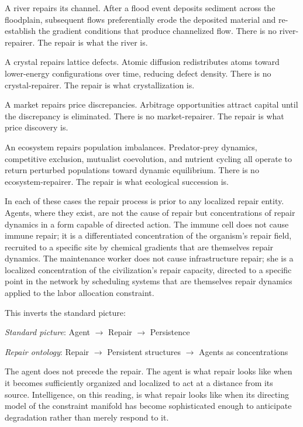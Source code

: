 \documentclass[11pt, a4paper]{article}
\theoremstyle{definition}
\theoremstyle{remark}
\begin{document}
A river repairs its channel. After a flood event deposits sediment across the
floodplain, subsequent flows preferentially erode the deposited material and
re-establish the gradient conditions that produce channelized flow. There is no
river-repairer. The repair is what the river is.

A crystal repairs lattice defects. Atomic diffusion redistributes atoms toward
lower-energy configurations over time, reducing defect density. There is no
crystal-repairer. The repair is what crystallization is.

A market repairs price discrepancies. Arbitrage opportunities attract capital
until the discrepancy is eliminated. There is no market-repairer. The repair
is what price discovery is.

An ecosystem repairs population imbalances. Predator-prey dynamics, competitive
exclusion, mutualist coevolution, and nutrient cycling all operate to return
perturbed populations toward dynamic equilibrium. There is no
ecosystem-repairer. The repair is what ecological succession is.

In each of these cases the repair process is prior to any localized repair
entity. Agents, where they exist, are not the cause of repair but concentrations
of repair dynamics in a form capable of directed action. The immune cell does not
cause immune repair; it is a differentiated concentration of the organism's
repair field, recruited to a specific site by chemical gradients that are
themselves repair dynamics. The maintenance worker does not cause infrastructure
repair; she is a localized concentration of the civilization's repair capacity,
directed to a specific point in the network by scheduling systems that are
themselves repair dynamics applied to the labor allocation constraint.

This inverts the standard picture:

\medskip
\noindent\textit{Standard picture}: Agent $\to$ Repair $\to$ Persistence

\noindent\textit{Repair ontology}: Repair $\to$ Persistent structures $\to$ Agents as concentrations
\medskip

The agent does not precede the repair. The agent is what repair looks like when
it becomes sufficiently organized and localized to act at a distance from its
source. Intelligence, on this reading, is what repair looks like when its
directing model of the constraint manifold has become sophisticated enough to
anticipate degradation rather than merely respond to it.
\end{document}
